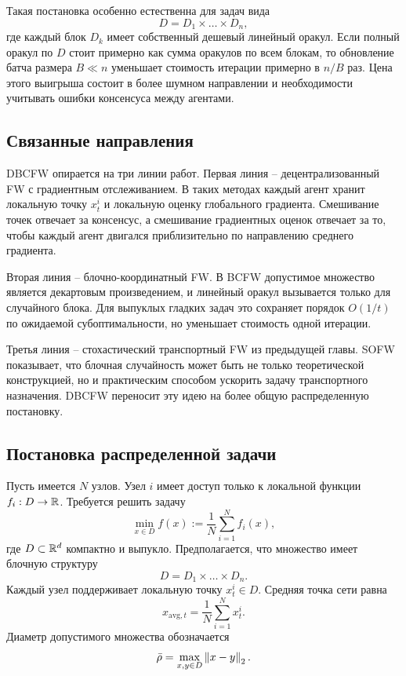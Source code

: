 Такая постановка особенно естественна для задач вида
\[
    D=D_1\times\dots\times D_n,
\]
где каждый блок $D_k$ имеет собственный дешевый линейный оракул.
Если полный оракул по $D$ стоит примерно как сумма оракулов по всем блокам, то обновление
батча размера $B\ll n$ уменьшает стоимость итерации примерно в $n/B$ раз.
Цена этого выигрыша состоит в более шумном направлении и необходимости учитывать ошибки
консенсуса между агентами.

\subsection{Связанные направления}

DBCFW опирается на три линии работ.
Первая линия -- децентрализованный FW с градиентным отслеживанием.
В таких методах каждый агент хранит локальную точку $x_t^i$ и локальную оценку глобального
градиента.
Смешивание точек отвечает за консенсус, а смешивание градиентных оценок отвечает за то,
чтобы каждый агент двигался приблизительно по направлению среднего градиента.

Вторая линия -- блочно-координатный FW.
В BCFW допустимое множество является декартовым произведением, и линейный оракул вызывается
только для случайного блока.
Для выпуклых гладких задач это сохраняет порядок $O(1/t)$ по ожидаемой субоптимальности,
но уменьшает стоимость одной итерации.

Третья линия -- стохастический транспортный FW из предыдущей главы.
SOFW показывает, что блочная случайность может быть не только теоретической конструкцией,
но и практическим способом ускорить задачу транспортного назначения.
DBCFW переносит эту идею на более общую распределенную постановку.

\subsection{Постановка распределенной задачи}

Пусть имеется $N$ узлов.
Узел $i$ имеет доступ только к локальной функции $f_i:D\to\mathbb{R}$.
Требуется решить задачу
\begin{equation}
    \min_{x\in D}
    f(x)
    :=
    \frac{1}{N}\sum_{i=1}^{N}f_i(x),
    \label{eq:dbcfw-problem}
\end{equation}
где $D\subset\mathbb{R}^d$ компактно и выпукло.
Предполагается, что множество имеет блочную структуру
\[
    D=D_1\times\dots\times D_n.
\]
Каждый узел поддерживает локальную точку $x_t^i\in D$.
Средняя точка сети равна
\[
    x_{\mathrm{avg},t}
    =
    \frac{1}{N}\sum_{i=1}^{N}x_t^i.
\]
Диаметр допустимого множества обозначается
\[
    \bar\rho=
    \max_{x,y\in D}\left\|x-y\right\|_2.
\]

